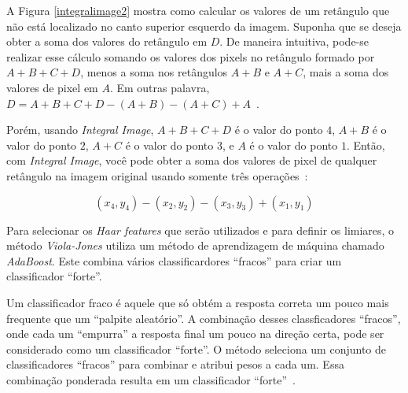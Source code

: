 A Figura \ref{integralimage2} mostra como calcular os valores de um retângulo que não está localizado no canto superior esquerdo da imagem. Suponha que se deseja obter a soma dos valores do retângulo em $\displaystyle D$. De maneira intuitiva, pode-se realizar esse cálculo somando os valores dos pixels no retângulo formado por $\displaystyle A+B+C+D$, menos a soma nos retângulos $\displaystyle A+B$ e $\displaystyle A+C$, mais a soma dos valores de pixel em $\displaystyle A$. Em outras palavra, $\displaystyle D = A+B+C+D-(A+B)-(A+C)+A$~\cite{servodetection, violajones}.

Porém, usando \textit{Integral Image}, $\displaystyle A+B+C+D$ é o valor do ponto $\displaystyle 4$, $\displaystyle A+B$ é o valor do ponto $\displaystyle 2$, $\displaystyle A+C$ é o valor do ponto $\displaystyle 3$, e $\displaystyle A$ é o valor do ponto $\displaystyle 1$. Então, com \textit{Integral Image}, você pode obter a soma dos valores de pixel de qualquer retângulo na imagem original usando somente três operações~\cite{servodetection, violajones}:

	\begin{equation}
		(x_4,y_4) - (x_2,y_2) - (x_3,y_3) + (x_1,y_1)
		\label{equacaointegralimage}
	\end{equation} 

Para selecionar os \textit{Haar features} que serão utilizados e para definir os limiares, o método \textit{Viola-Jones} utiliza um método de aprendizagem de máquina chamado \textit{AdaBoost}. Este combina vários classificardores ``fracos'' para criar um classificador ``forte''. 

Um classificador fraco é aquele que só obtém a resposta correta um pouco mais frequente que um ``palpite aleatório''. A combinação desses classficadores ``fracos'', onde cada um ``empurra'' a resposta final um pouco na direção certa, pode ser considerado como um classificador ``forte''. O método  seleciona um conjunto de classificadores ``fracos'' para combinar e atribui pesos a cada um. Essa combinação ponderada resulta em um classificador ``forte''~\cite{servodetection}.

